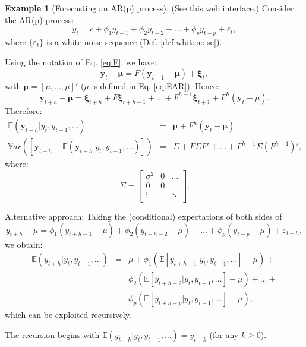 \documentclass[
  11pt,
]{book}
\theoremstyle{definition}
\theoremstyle{definition}
\newtheorem{example}{Example}[chapter]
\theoremstyle{definition}
\theoremstyle{definition}
\theoremstyle{remark}
\begin{document}
\begin{example}[Forecasting an AR(p) process]
\protect\hypertarget{exm:fcstARp}{}\label{exm:fcstARp}(See \href{https://jrenne.shinyapps.io/ARpFcst}{this web interface}.) Consider the AR(p) process:
\[
y_t = c + \phi_1 y_{t-1} + \phi_2 y_{t-2} + \dots + \phi_p y_{t-p} + \varepsilon_t,
\]
where \(\{\varepsilon_t\}\) is a white noise sequence (Def. \ref{def:whitenoise}).

Using the notation of Eq. \eqref{eq:F}, we have:
\[
\mathbf{y}_t - \boldsymbol\mu = F (\mathbf{y}_{t-1}- \boldsymbol\mu) + \boldsymbol\xi_t,
\]
with \(\boldsymbol\mu = [\mu,\dots,\mu]'\) (\(\mu\) is defined in Eq. \eqref{eq:EAR}). Hence:
\[
\mathbf{y}_{t+h} - \boldsymbol\mu = \boldsymbol\xi_{t+h} + F \boldsymbol\xi_{t+h-1} + \dots + F^{h-1} \boldsymbol\xi_{t+1} + F^h (\mathbf{y}_{t}- \mu).
\]
Therefore:
\begin{eqnarray*}
\mathbb{E}(\mathbf{y}_{t+h}|y_{t},y_{t-1},\dots) &=& \boldsymbol\mu + F^{h}(\mathbf{y}_t - \boldsymbol\mu)\\
\mathbb{V}ar\left( [\mathbf{y}_{t+h} - \mathbb{E}(\mathbf{y}_{t+h}|y_{t},y_{t-1},\dots)] \right) &=& \Sigma + F\Sigma F' + \dots + F^{h-1}\Sigma (F^{h-1})',
\end{eqnarray*}
where:
\[
\Sigma = \left[
\begin{array}{ccc}
\sigma^2  & 0& \dots\\
0  & 0 & \\
\vdots  & & \ddots \\
\end{array}
\right].
\]

Alternative approach: Taking the (conditional) expectations of both sides of
\[
y_{t+h} - \mu = \phi_1 (y_{t+h-1} - \mu) + \phi_2 (y_{t+h-2} - \mu) + \dots + \phi_p (y_{t-p} - \mu) + \varepsilon_{t+h},
\]
we obtain:
\begin{eqnarray*}
\mathbb{E}(y_{t+h}|y_{t},y_{t-1},\dots) &=& \mu + \phi_1\left(\mathbb{E}[y_{t+h-1}|y_{t},y_{t-1},\dots] - \mu\right)+\\
&&\phi_2\left(\mathbb{E}[y_{t+h-2}|y_{t},y_{t-1},\dots] - \mu\right) + \dots +\\
&& \phi_p\left(\mathbb{E}[y_{t+h-p}|y_{t},y_{t-1},\dots] - \mu\right),
\end{eqnarray*}
which can be exploited recursively.

The recursion begins with \(\mathbb{E}(y_{t-k}|y_{t},y_{t-1},\dots)=y_{t-k}\) (for any \(k \ge 0\)).
\end{example}
\end{document}
